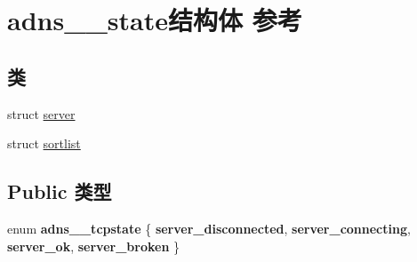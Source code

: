 \hypertarget{structadns____state}{}\section{adns\+\_\+\+\_\+state结构体 参考}
\label{structadns____state}
\subsection*{类}
\begin{DoxyCompactItemize}
\item 
struct \hyperlink{structadns____state_1_1server}{server}
\item 
struct \hyperlink{structadns____state_1_1sortlist}{sortlist}
\end{DoxyCompactItemize}
\subsection*{Public 类型}
\begin{DoxyCompactItemize}
\item 
\mbox{\label{structadns____state_ad182eacfa98a7b8fa88588afb054dd11}} 
enum {\bfseries adns\+\_\+\+\_\+tcpstate} \{ {\bfseries server\+\_\+disconnected}, 
{\bfseries server\+\_\+connecting}, 
{\bfseries server\+\_\+ok}, 
{\bfseries server\+\_\+broken}
 \}
\end{DoxyCompactItemize}
